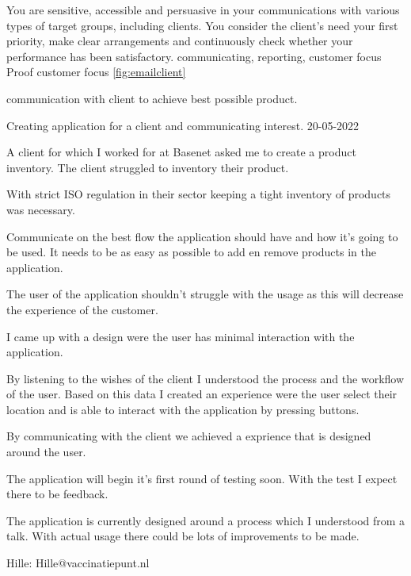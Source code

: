 \competentie
{%
	\competentieformulier
	{%
		You are sensitive, accessible and persuasive in your communications with various types of target groups, including clients. You consider the client's need your first priority, make clear arrangements and continuously check whether your performance has been satisfactory.
	}
	{%
		communicating,%
		reporting,%
		customer focus%
	}
	{%
		Proof
	}
	{%
		customer focus
	}
	{%
		\ref{fig:emailclient}
	}
}
{%
	\bewijs
	{%
		communication with client to achieve best possible product.
	}
	{%
		\starr
		{%
			Creating application for a client and communicating interest.
		}
		{%
			20-05-2022
		}
		{%
			A client for which I worked for at Basenet asked me to create a product inventory.
			The client struggled to inventory their product.

			With strict ISO regulation in their sector keeping a tight inventory of products was necessary.

		}
		{%
			Communicate on the best flow the application should have and how it's going to be used.
			It needs to be as easy as possible to add en remove products in the application.

			The user of the application shouldn't struggle with the usage as this will decrease the experience of the customer.
		}
		{%
			I came up with a design were the user has minimal interaction with the application.

			By listening to the wishes of the client I understood the process and the workflow of the user.
			Based on this data I created an experience were the user select their location and is able to interact with the application by pressing buttons.

		}
		{%
			By communicating with the client we achieved a exprience that is designed around the user.
		}
		{%
			The application will begin it's first round of testing soon.
			With the test I expect there to be feedback.

			The application is currently designed around a process which I understood from a talk.
			With actual usage there could be lots of improvements to be made.
		}
		{
			Hille: Hille@vaccinatiepunt.nl
		}
	}
	{%

}}

